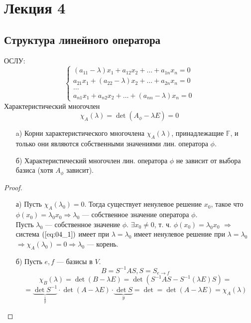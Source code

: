 \section{Лекция 4}
\subsection{Структура линейного оператора}
ОСЛУ:
\begin{equation}
  \label{eq:04_1}
\begin{cases}
  (a_{11} - \lambda)x_1 + a_{12} x_2 + \ldots + a_{1n} x_n = 0 \\
  a_{21} x_1 + (a_{22} - \lambda)x_2 + \ldots + a_{2n}x_n = 0 \\
  \ldots \\
  a_{n 1} x_1 + a_{n 2} x_2 + \ldots + (a_{n n} - \lambda) x_{n} = 0
\end{cases}
\end{equation}
Характеристический многочлен
\[
\chi_A(\lambda) = \det(A_\phi - \lambda E) = 0
\]
\begin{statement}
\label{statement:04_1}
  \begin{itemize}
    \item [a) ] Корни характеристического многочлена $\chi_A(\lambda)$, принадлежащие $\mathbb{F}$, и только они являются собственными значениями лин. оператора $\phi$.
    \item [б) ] Характеристический многочлен лин. оператора $\phi$ не зависит от выбора базиса (хотя $A_\phi$ зависит).
  \end{itemize}
\end{statement}
\begin{proof}
  \begin{itemize}
    \item [а) ] Пусть $\chi_A(\lambda_0) = 0$. Тогда существует ненулевое решение $x_0$, такое что $\phi(x_0) = \lambda_0 x_0 \Rightarrow \lambda_0$ --- собственное значение оператора $\phi$. \\
      Пусть $\lambda_0$ --- собственное значение $\phi$. $\exists x_0 \neq 0$, т. ч. $\phi(x_0) = \lambda_0 x_0$ $\Rightarrow$ система $(\ref{eq:04_1})$ имеет при $\lambda = \lambda_0$ имеет ненулевое решение при $\lambda = \lambda_0$ $ \Rightarrow \chi_A(\lambda_0) = 0 \Rightarrow \lambda_0$ --- корень. \\

    \item [б) ]
      Пусть $e, f$ --- базисы в $V$.
      \[
      B = S^{-1}AS, S = S_{e \to f}
      \]
      \[
      \chi_B(\lambda) = \det(B - \lambda E) = \det(S^{-1}AS - S^{-1}(\lambda E)S) = 
      \]
      \[
       = \underbrace{\det S^{-1}}_{\frac{1}{y}} \cdot \det(A - \lambda E) \cdot \underbrace{\det S}_{y} = \det = \det(A - \lambda E) = \chi_A(\lambda)
      \]
  \end{itemize}
\end{proof}
